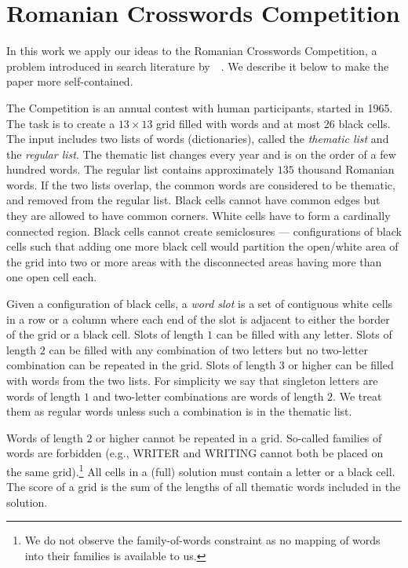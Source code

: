 \section{Romanian Crosswords Competition}
\label{sec::roco}


In this work we apply our ideas to the Romanian Crosswords Competition, a problem introduced in search literature by~\citeauthor{DBLP:conf/socs/BoteaB21}~.
We describe it below to make the paper more self-contained.

The Competition is an annual contest with human participants, started in 1965.
The task is to create a $13\times13$ grid filled with words and
at most $26$ black cells.
The input includes two lists of words (dictionaries), called the \emph{thematic list}
and the \emph{regular list}.
The thematic list changes every year and is on the order of a few hundred words.
The regular list contains approximately $135$ thousand Romanian words.
If the two lists overlap, the common words 
are considered to be thematic, and removed from the regular list.
Black cells cannot have common edges but they are allowed to have common corners. 
White cells have to form a cardinally connected region. Black cells cannot create semiclosures --- configurations of black cells such that
adding one more black cell would partition the open/white area of the grid into two or more
areas with the disconnected areas having more than one open cell each.

Given a configuration of black cells, a \emph{word slot}
is a set of contiguous white cells in a  row or a column
where each end of the slot is adjacent to either the 
border of the grid or a black cell.
%
Slots of length $1$ can be filled with any letter.
Slots of length $2$ can be filled with any combination of two letters
but no two-letter combination can be repeated in the grid.
Slots of length $3$ or higher can be filled with words from the two lists.
For simplicity we say that singleton letters are words
of length $1$ and two-letter combinations are words of length $2$.
We treat them as regular words unless such a combination is in the thematic list.%

Words of length $2$ or higher cannot be repeated in a grid.
So-called families of words are forbidden (e.g., 
WRITER and WRITING cannot both be placed on the same grid).\footnote{We do not observe the family-of-words constraint as no mapping of words into their families is available to us.}
All cells in a (full) solution must contain a letter or a black cell.
The score of a grid is the sum of the lengths of all thematic words included in the solution. 

